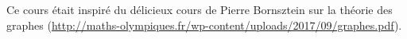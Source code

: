 Ce cours était inspiré du délicieux cours de Pierre Bornsztein sur la théorie des graphes (\url{http://maths-olympiques.fr/wp-content/uploads/2017/09/graphes.pdf}).
